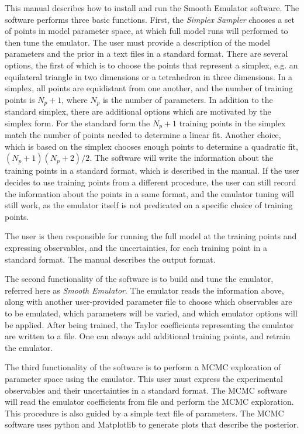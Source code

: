 \documentclass[12pt]{article}
\numberwithin{equation}{section}
\numberwithin{figure}{section}
\begin{document}
This manual describes how to install and run the Smooth Emulator software. The software performs three basic functions. First, the {\it Simplex Sampler} chooses a set of points in model parameter space, at which full model runs will performed to then tune the emulator. The user must provide a description of the model parameters and the prior in a text files in a standard format. There are several options, the first of which is to choose the points that represent a simplex, e.g. an equilateral triangle in two dimensions or a tetrahedron in three dimensions. In a simplex, all points are equidistant from one another, and the number of training points is $N_p+1$, where $N_p$ is the number of parameters. In addition to the standard simplex, there are additional options which are motivated by the simplex form. For the standard form the  $N_p+1$ training points in the simplex match the number of points needed to determine a linear fit. Another choice, which is based on the simplex chooses enough points to determine a quadratic fit, $(N_p+1)(N_p+2)/2$. The software will write the information about the training points in a standard format, which is described in the manual. If the user decides to use training points from a different procedure, the user can still record the information about the points in a same format, and the emulator tuning will still work, as the emulator itself is not predicated on a specific choice of training points.

 The user is then responsible for running the full model at the training points and expressing observables, and the uncertainties, for each training point in a standard format. The manual describes the output format.

 The second functionality of the software is to build and tune the emulator, referred here as {\it Smooth Emulator}. The emulator reads the information above, along with another user-provided parameter file to choose which observables are to be emulated, which parameters will be varied, and which emulator options will be applied. After being trained, the Taylor coefficients representing the emulator are written to a file. One can always add additional training points, and retrain the emulator. 

The third functionality of the software is to perform a MCMC exploration of parameter space using the emulator. This user must express the experimental observables and their uncertainties in a standard format. The MCMC software will read the emulator coefficients from file and perform the MCMC exploration. This procedure is also guided by a simple text file of parameters. The MCMC software uses python and Matplotlib to generate plots that describe the posterior. 
\end{document}
